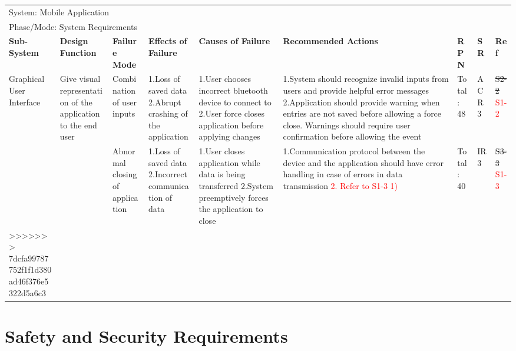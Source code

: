 \documentclass[12pt, titlepage]{article}
\begin{document}
\begin{landscape}
\begin{table}[H]
\begin{tabular}{| p{} | p{}  | p{} | p{} | p{} | p{} | p{} | p{} | p{} |}
    \multicolumn{9}{|l|}{System: Mobile Application } \\
    \multicolumn{9}{|l|}{Phase/Mode: System Requirements} \\ \hline
    \textbf{Sub-System} & \textbf{Design Function} & \textbf{Failure Mode} & \textbf{Effects of Failure} & \textbf{Causes of Failure} & \textbf{Recommended Actions} & \textbf{RPN} & \textbf{SR} & \textbf{Ref} \\ \hline

    Graphical User Interface & Give visual representation of the application to the end user & Combination of user inputs & 1.Loss of saved data \newline 2.Abrupt crashing of the application  &  1.User chooses incorrect bluetooth device to connect to \newline 2.User force closes application before applying changes  &  1.System should recognize invalid inputs from users and provide helpful error messages \newline 2.Application should provide warning when entries are not saved before allowing a force close. Warnings should require user confirmation before allowing the event  & Total: 48 & ACR3 & \sout{S2-2} \textcolor{red}{S1-2} \\ \cline{3-9}

     & & Abnormal closing of application & 1.Loss of saved data \newline 2.Incorrect communication of data  & 1.User closes application while data is being transferred \newline 2.System preemptively forces the application to close & 1.Communication protocol between the device and the application should have error handling in case of errors in data transmission \newline \textcolor{red}{2. Refer to S1-3 1)}  & Total: 40 & IR3 & \sout{S3-3} \textcolor{red}{S1-3} \\ \hline
>>>>>>> 7dcfa99787752f1f1d380ad46f376e5322d5a6c3
    
    \end{tabular}
    
\end{table}

\end{landscape}

\section{Safety and Security Requirements}
\end{document}
